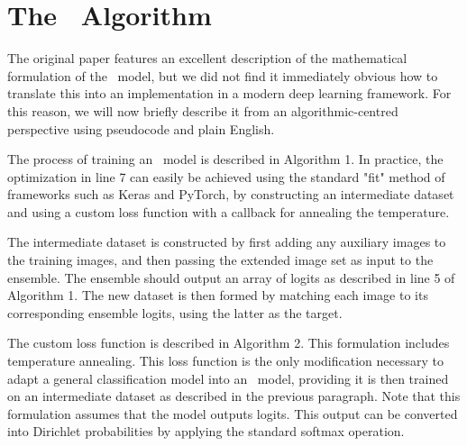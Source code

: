 

\appendix

\section{The \EnDD \ Algorithm}
\label{sec:the-endd-algorithm}

The original paper features an excellent description of the mathematical formulation of the \EnDD \ model, but we did not find it immediately obvious how to translate this into an implementation in a modern deep learning framework. For this reason, we will now briefly describe it from an algorithmic-centred perspective using pseudocode and plain English.  

The process of training an \EnDD \ model is described in Algorithm 1. In practice, the optimization in line 7 can easily be achieved using the standard "fit" method of frameworks such as Keras and PyTorch, by constructing an intermediate dataset and using a custom loss function with a callback for annealing the temperature. 

The intermediate dataset is constructed by first adding any auxiliary images to the training images, and then passing the extended image set as input to the ensemble. The ensemble should output an array of logits as described in line 5 of Algorithm 1. The new dataset is then formed by matching each image to its corresponding ensemble logits, using the latter as the target. 

The custom loss function is described in Algorithm 2. This formulation includes temperature annealing. This loss function is the only modification necessary to adapt a general classification model into an \EnDD \ model, providing it is then trained on an intermediate dataset as described in the previous paragraph. Note that this formulation assumes that the model outputs logits. This output can be converted into Dirichlet probabilities by applying the standard softmax operation.  



